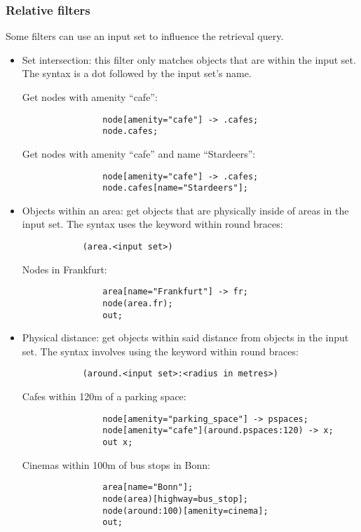 \documentclass[main.tex]{subfiles}
\begin{document}
\subsubsection{Relative filters}
Some filters can use an input set to influence the retrieval query.
\begin{itemize}
    \item Set intersection: this filter only matches objects that are within
        the input set. The syntax is a dot followed by the input set's name.
        \begin{example}
            Get nodes with amenity ``cafe'':
            \begin{lstlisting}
                node[amenity="cafe"] -> .cafes;
                node.cafes;
            \end{lstlisting}

            Get nodes with amenity ``cafe'' and name ``Stardeers'':
            \begin{lstlisting}
                node[amenity="cafe"] -> .cafes;
                node.cafes[name="Stardeers"];
            \end{lstlisting}
        \end{example}
    \item Objects within an area: get objects that are physically inside
        of areas in the input set. The syntax uses the  keyword
        within round braces:
        \begin{lstlisting}
            (area.<input set>)
        \end{lstlisting}
        \begin{example}
            Nodes in Frankfurt:
            \begin{lstlisting}
                area[name="Frankfurt"] -> fr;
                node(area.fr);
                out;
            \end{lstlisting}
        \end{example}
    \item Physical distance: get objects within said distance from objects in
        the input set. The syntax involves using the  keyword
        within round braces:
        \begin{lstlisting}
            (around.<input set>:<radius in metres>)
        \end{lstlisting}
        \begin{example}
            Cafes within 120m of a parking space:
            \begin{lstlisting}
                node[amenity="parking_space"] -> pspaces;
                node[amenity="cafe"](around.pspaces:120) -> x;
                out x;
            \end{lstlisting}

            Cinemas within 100m of bus stops in Bonn:
            \begin{lstlisting}
                area[name="Bonn"];
                node(area)[highway=bus_stop];
                node(around:100)[amenity=cinema];
                out;
            \end{lstlisting}
        \end{example}
\end{itemize}
\end{document}
